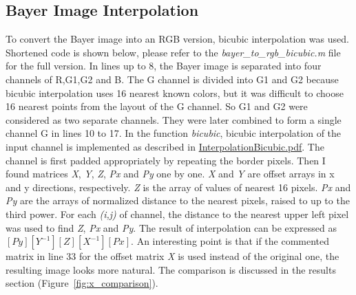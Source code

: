 \subsection{Bayer Image Interpolation}
To convert the Bayer image into an RGB version, bicubic interpolation was used. Shortened code is shown below, please refer to the \emph{bayer\_to\_rgb\_bicubic.m} file for the full version. In lines up to 8, the Bayer image is separated into four channels of R,G1,G2 and B. The G channel is divided into G1 and G2 because bicubic interpolation uses 16 nearest known colors, but it was difficult to choose 16 nearest points from the layout of the G channel. So G1 and G2 were considered as two separate channels. They were later combined to form a single channel G in lines 10 to 17. In the function \emph{bicubic}, bicubic interpolation of the input channel is implemented as described in \href{http://www.ahinson.com/algorithms_general/Sections/InterpolationRegression/InterpolationBicubic.pdf}{InterpolationBicubic.pdf}. The channel is first padded appropriately by repeating the border pixels. Then I found matrices \emph{X}, \emph{Y}, \emph{Z}, \emph{Px} and \emph{Py} one by one. \emph{X} and \emph{Y} are offset arrays in x and y directions, respectively. \emph{Z} is the array of values of nearest 16 pixels. \emph{Px} and \emph{Py} are the arrays of normalized distance to the nearest pixels, raised to up to the third power. For each \emph{(i,j)} of channel, the distance to the nearest upper left pixel was used to find \emph{Z},  \emph{Px} and \emph{Py}. The result of interpolation can be expressed as $[Py][Y^{-1}][Z][X^{-1}][Px]$. An interesting point is that if the commented matrix in line 33 for the offset matrix \emph{X} is used instead of the original one, the resulting image looks more natural. The comparison is discussed in the results section (Figure~\ref{fig:x_comparison}).

